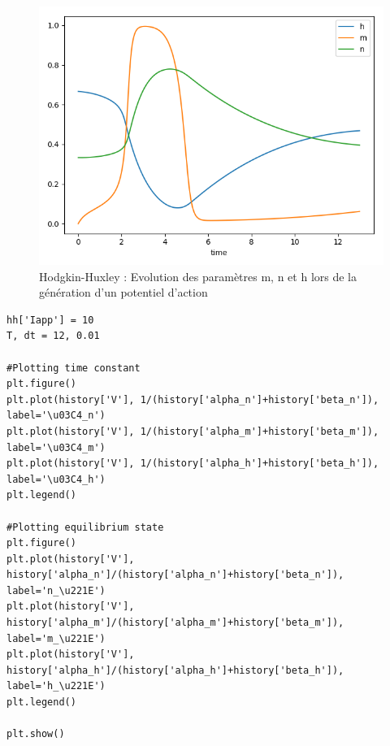 \documentclass[12pt]{scrartcl}
\begin{document}
\begin{figure}[!h]
\centering
\includegraphics[scale=0.5]{imgs/hh52.png}
\caption{Hodgkin-Huxley : Evolution des paramètres m, n et h lors de la génération d'un potentiel d'action}
\label{hh52}
\end{figure}

\clearpage

\begin{lstlisting}[caption = {Hodgkin-Huxley : Constantes de temps et états à l'équilibre}]
hh['Iapp'] = 10
T, dt = 12, 0.01

#Plotting time constant
plt.figure()
plt.plot(history['V'], 1/(history['alpha_n']+history['beta_n']),
label='\u03C4_n')
plt.plot(history['V'], 1/(history['alpha_m']+history['beta_m']),
label='\u03C4_m')
plt.plot(history['V'], 1/(history['alpha_h']+history['beta_h']),
label='\u03C4_h')
plt.legend()

#Plotting equilibrium state
plt.figure()
plt.plot(history['V'],
history['alpha_n']/(history['alpha_n']+history['beta_n']),
label='n_\u221E')
plt.plot(history['V'],
history['alpha_m']/(history['alpha_m']+history['beta_m']),
label='m_\u221E')
plt.plot(history['V'],
history['alpha_h']/(history['alpha_h']+history['beta_h']),
label='h_\u221E')
plt.legend()

plt.show()
\end{lstlisting}
\end{document}
